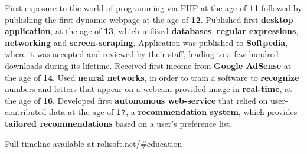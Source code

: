 \documentclass[11pt,a4paper,sans]{moderncv}
\renewcommand*{\httplink}[2][]{%
	\ifthenelse{\equal{#1}{}}%
	{\href{https://#2}{#2}}%
	{\href{https://#2}{#1}}}
\begin{document}
	First exposure to the world of programming via PHP at the age of \textbf{11} followed by publishing the first dynamic webpage at the age of \textbf{12}. Published first \textbf{desktop application}, at the age of \textbf{13}, which utilized \textbf{databases}, \textbf{regular expressions}, \textbf{networking} and \textbf{screen-scraping}. Application was published to \textbf{Softpedia}, where it was accepted and reviewed by their staff, leading to a few hundred downloads during its lifetime. Received first income from \textbf{Google AdSense} at the age of \textbf{14}. Used \textbf{neural networks}, in order to train a software to \textbf{recognize} numbers and letters that appear on a webcam-provided image in \textbf{real-time}, at the age of \textbf{16}. Developed first \textbf{autonomous web-service} that relied on user-contributed data at the age of \textbf{17}, a \textbf{recommendation system}, which provides \textbf{tailored recommendations} based on a user's preference list.

	\vspace{6pt}

	Full timeline available at \httplink{rolisoft.net/\#education}
\end{document}
